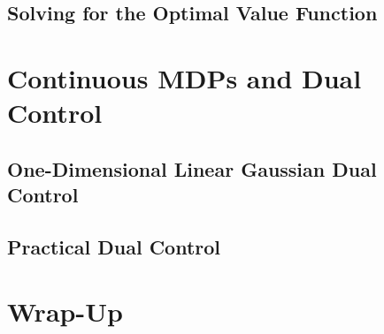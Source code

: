 		\subsection{Solving for the Optimal Value Function} %

	\section{Continuous MDPs and Dual Control} %

		\subsection{One-Dimensional Linear Gaussian Dual Control} %

		\subsection{Practical Dual Control} %

	\section{Wrap-Up} %

